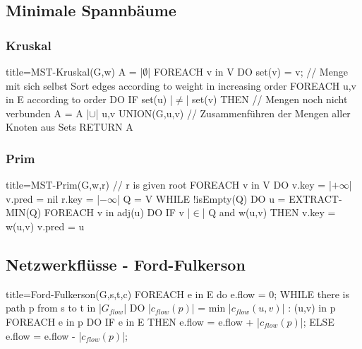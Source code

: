     \subsection{Minimale Spannbäume}
            
        \subsubsection{Kruskal}
            \begin{ccode}[autogobble, escapeinside=||]{title={MST-Kruskal(G,w)}}
            A = |$\emptyset$|
            FOREACH v in V DO
                set(v) = {v};       // Menge mit sich selbst
            Sort edges according to weight in increasing order
            FOREACH {u,v} in E according to order DO
                IF set(u) |$\neq$| set(v) THEN     // Mengen noch nicht verbunden
                    A = A |$\cup$| {{u,v}}
                    UNION(G,u,v)   // Zusammenführen der Mengen aller Knoten aus Sets
            RETURN A
            \end{ccode}

        \subsubsection{Prim}
            \begin{ccode}[autogobble, escapeinside=||]{title={MST-Prim(G,w,r)}}
            // r is given root
            FOREACH v in V DO
                v.key = |$+\infty$|
                v.pred = nil
            r.key = |$-\infty$|
            Q = V
            WHILE !isEmpty(Q) DO
                u = EXTRACT-MIN(Q)
                FOREACH v in adj(u) DO
                    IF v |$\in$| Q and w({u,v}) THEN
                        v.key = w({u,v})
                        v.pred = u
            \end{ccode}
        
    \subsection{Netzwerkflüsse - Ford-Fulkerson}
            \begin{ccode}[autogobble, escapeinside=||]{title={Ford-Fulkerson(G,s,t,c)}}
            FOREACH e in E do e.flow = 0;
            WHILE there is path p from s to t in |$G_{flow}$| DO
                |$c_{flow}(p)$| = min {|$c_{flow}(u,v)$| : (u,v) in p}
                FOREACH e in p DO
                    IF e in E THEN
                        e.flow = e.flow + |$c_{flow}(p)$|;
                    ELSE
                        e.flow = e.flow - |$c_{flow}(p)$|;
            \end{ccode}

